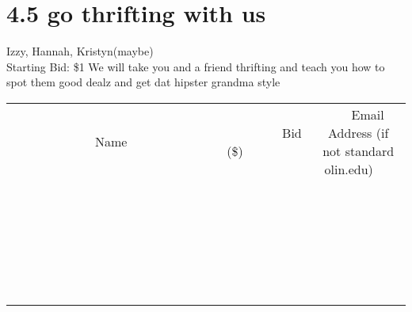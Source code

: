 \documentclass[11pt]{article}
\begin{document}
\section*{4.5 go thrifting with us}
Izzy, Hannah, Kristyn(maybe)
\\
Starting Bid: \$1
\newline
We will take you  and a friend thrifting and teach you how to spot them good dealz and get dat hipster grandma style
\\[6ex]
\begin{tabular}{c c c}
~~~~~~~~~~~~~Name~~~~~~~~~~~~~ & ~~~~~~~~~Bid (\$)~~~~~~~~~  & ~~~Email Address (if not standard olin.edu)~~~\\
 & & \\
\hline
 & & \\
\hline
 & & \\
\hline
 & & \\
\hline
 & & \\
\hline
 & & \\
\hline
 & & \\
\hline
 & & \\
\hline
 & & \\
\hline
 & & \\
\hline
 & & \\
\hline
 & & \\
\hline
 & & \\
\hline
 & & \\
\hline
 & & \\
\hline
 & & \\
\hline
 & & \\
\hline
 & & \\
\hline
 & & \\
\hline
 & & \\
\hline
 & & \\
\hline
 & & \\
\hline
 & & \\
\hline
 & & \\
\hline
 & & \\
\hline
 & & \\
\hline
\end{tabular}
\newpage
\end{document}
